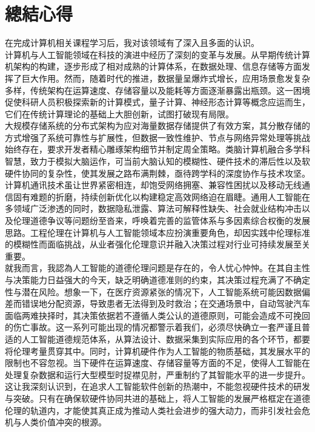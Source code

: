 \documentclass[supercite]{Experimental_Report}
\theoremstyle{definition}
\begin{document}
	\section{總結心得}
	在完成计算机相关课程学习后，我对该领域有了深入且多面的认识。\\
	计算机与人工智能领域在科技的演进中经历了深刻的变革与发展。从早期传统计算机架构的构建，逐步形成了相对成熟的计算体系，在数据处理、信息存储等方面发挥了巨大作用。然而，随着时代的推进，数据量呈爆炸式增长，应用场景愈发复杂多样，传统架构在运算速度、存储容量以及能耗等方面逐渐暴露出瓶颈。这一困境促使科研人员积极探索新的计算模式，量子计算、神经形态计算等概念应运而生，它们在传统计算理论的基础上大胆创新，试图打破现有局限。\\
	大规模存储系统的分布式架构为应对海量数据存储提供了有效方案，其分散存储的方式增强了系统可靠性与扩展性，但数据一致性维护、节点与网络异常处理等挑战始终存在，要求开发者精心雕琢架构细节并制定周全策略。类脑计算机融合多学科智慧，致力于模拟大脑运作，可当前大脑认知的模糊性、硬件技术的滞后性以及软硬件协同的复杂性，使其发展之路布满荆棘，亟待跨学科的深度协作与技术攻坚。计算机通讯技术虽让世界紧密相连，却饱受网络拥塞、兼容性困扰以及移动无线通信固有难题的折磨，持续创新优化以构建稳定高效网络迫在眉睫。通用人工智能在多领域广泛渗透的同时，数据隐私泄露、算法可解释性缺失、社会就业结构冲击以及伦理道德争议等问题纷至沓来，呼唤着完善的监管体系与多因素综合权衡的发展思路。工程伦理在计算机与人工智能领域本应扮演重要角色，却因实践中伦理标准的模糊性而面临挑战，从业者强化伦理意识并融入决策过程对行业可持续发展至关重要。\\
	就我而言，我認為人工智能的道德伦理问题是存在的，令人忧心忡忡。在其自主性与决策能力日益强大的今天，缺乏明确道德准则的约束，其决策过程充满了不确定性与潜在风险。想象一下，在医疗资源紧张的情况下，人工智能系统可能因数据偏差而错误地分配资源，导致患者无法得到及时救治；在交通场景中，自动驾驶汽车面临两难抉择时，其决策依据若不遵循人类公认的道德原则，可能会造成不可挽回的伤亡事故。这一系列可能出现的情况都警示着我们，必须尽快确立一套严谨且普适的人工智能道德规范体系，从算法设计、数据采集到实际应用的各个环节，都要将伦理考量贯穿其中。同时，计算机硬件作为人工智能的物质基础，其发展水平的限制也不容忽视。当下硬件在运算速度、存储容量等方面的不足，使得人工智能在处理复杂数据和运行大型模型时捉襟见肘，严重制约了其智能水平的进一步提升。这让我深刻认识到，在追求人工智能软件创新的热潮中，不能忽视硬件技术的研发与突破。只有在确保软硬件协同共进的基础上，将人工智能的发展严格框定在道德伦理的轨道内，才能使其真正成为推动人类社会进步的强大动力，而非引发社会危机与人类价值冲突的根源。
	
	
\end{document}
